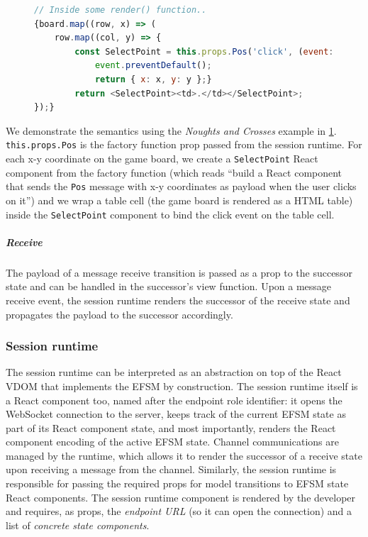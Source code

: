 \begin{figure}[!h]
\begin{lstlisting}[language=JavaScript, tabsize=4]
// Inside some render() function..
{board.map((row, x) => (
	row.map((col, y) => {
		const SelectPoint = this.props.Pos('click', (event: UIEvent) => {
			event.preventDefault();
			return { x: x, y: y };}
		return <SelectPoint><td>.</td></SelectPoint>;
});}
\end{lstlisting}
\label{lst:clientapp}
\end{figure}

We demonstrate the semantics using the \textit{Noughts and Crosses} example in
\cref{lst:clientapp}.
\texttt{this.props.Pos} is the factory function prop
passed from the session runtime.
For each x-y coordinate on the game board, we
create a \texttt{SelectPoint} React component from the factory function (which
reads ``build a React component that sends the \texttt{Pos} message with x-y
coordinates as payload when the user clicks on it'') and we wrap a table cell
(the game board is rendered as a HTML table) inside the \texttt{SelectPoint}
component to bind the click event on the table cell.

\subparagraph{Receive}
The payload of a message receive transition is passed as
a prop to the successor state and can be handled in the successor's view
function.
Upon a message receive event, the session runtime renders the
successor of the receive state and propagates the payload to the successor
accordingly.

\subsubsection{Session runtime}
\label{section:clientruntime}

The session runtime can be interpreted as an abstraction on top of the React
VDOM that implements the EFSM by construction.
The session runtime itself is a React component too, named after the endpoint
role identifier:
it opens the WebSocket connection to the server, keeps track of the current
EFSM state as part of its React component state, and most importantly, renders
the React component encoding of the active EFSM state.
Channel communications are managed by the runtime, which allows it to render
the successor of a receive state upon receiving a message from the channel.
Similarly, the session runtime is responsible for passing the required props
for model transitions to EFSM state React components.
The session runtime component is rendered by the developer and requires, as
props, the \textit{endpoint URL} (so it can open the connection) and a list of
\textit{concrete state components}.

